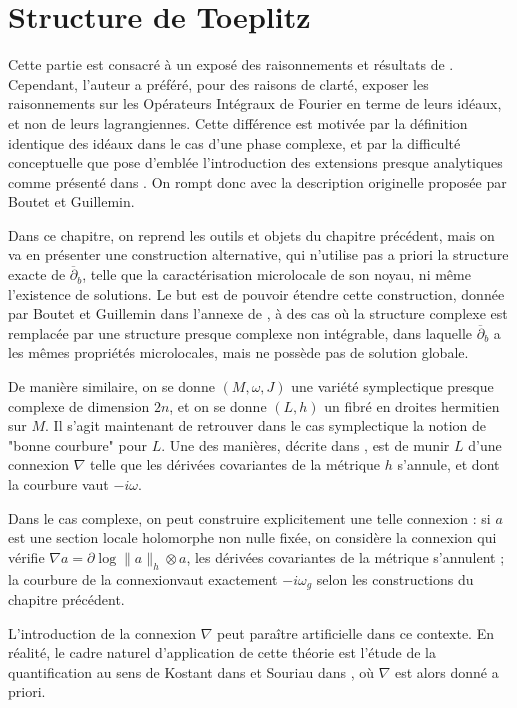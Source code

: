 \chapter{Structure de Toeplitz}

Cette partie est consacré à un exposé des raisonnements et résultats de \cite{Shiffman2002}. Cependant, l'auteur a préféré, pour des raisons de clarté, exposer les raisonnements sur les Opérateurs Intégraux de Fourier en terme de leurs idéaux, et non de leurs lagrangiennes. Cette différence est motivée par la définition identique des idéaux dans le cas d'une phase complexe, et par la difficulté conceptuelle que pose d'emblée l'introduction des extensions presque analytiques comme présenté dans \cite{melin1975fourier}. On rompt donc avec la description originelle proposée par Boutet et Guillemin.

Dans ce chapitre, on reprend les outils et objets du chapitre précédent, mais on va en présenter une construction alternative, qui n'utilise pas a priori la structure exacte de $\overline{\partial}_b$, telle que la caractérisation microlocale de son noyau, ni même l'existence de solutions. Le but est de pouvoir étendre cette construction, donnée par Boutet et Guillemin dans l'annexe de \cite{BoutetdeMonvel1981}, à des cas où la structure complexe est remplacée par une structure presque complexe non intégrable, dans laquelle $\overline{\partial}_b$ a les mêmes propriétés microlocales, mais ne possède pas de solution globale.

De manière similaire, on se donne $(M,\omega, J)$ une variété symplectique presque complexe de dimension $2n$, et on se donne $(L,h)$ un fibré en droites hermitien sur $M$. Il s'agit maintenant de retrouver dans le cas symplectique la notion de "bonne courbure" pour $L$. Une des manières, décrite dans \cite{woddhouse1997geometric}, est de munir $L$ d'une connexion $\nabla$ telle que les dérivées covariantes de la métrique $h$ s'annule, et dont la courbure vaut $-i\omega$. 

Dans le cas complexe, on peut construire explicitement une telle connexion : si $a$ est une section locale holomorphe non nulle fixée, on considère la connexion qui vérifie $\nabla a = \partial \log \|a\|_h \otimes a$, les dérivées covariantes de la métrique s'annulent ; la courbure de la connexionvaut exactement $-i\omega_g$ selon les constructions du chapitre précédent.

\begin{rem}L'introduction de la connexion $\nabla$ peut paraître artificielle dans ce contexte. En réalité, le cadre naturel d'application de cette théorie est l'étude de la quantification au sens de Kostant dans \cite{kostant1970quantization} et Souriau dans \cite{souriau1967quantification}, où $\nabla$ est alors donné a priori.\end{rem}

